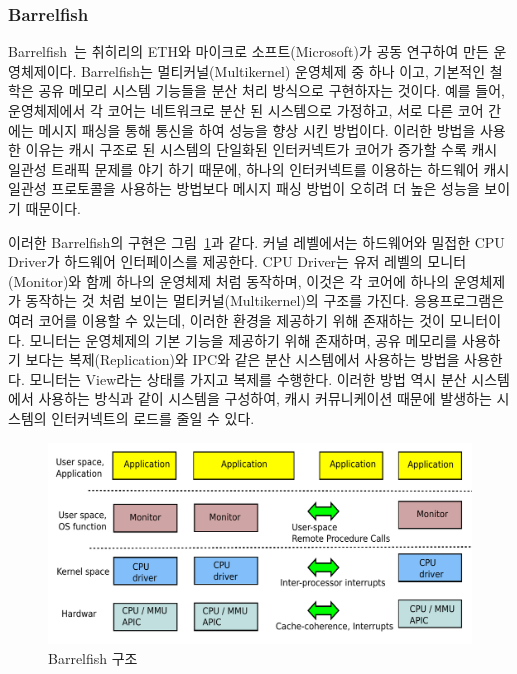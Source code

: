 \subsubsection{Barrelfish}

Barrelfish~\cite{Baumann2009Barrelfish}는 취히리의 ETH와 마이크로 소프트(Microsoft)가
공동 연구하여 만든 운영체제이다.
Barrelfish는 멀티커널(Multikernel) 운영체제 중 하나 이고, 기본적인 철학은 공유 메모리 시스템 
기능들을 분산 처리 방식으로 구현하자는 것이다.
예를 들어, 운영체제에서 각 코어는 네트워크로 분산 된 시스템으로 가정하고, 서로 다른 코어 간에는 메시지 
패싱을 통해 통신을 하여 성능을 향상 시킨 방법이다. 
이러한 방법을 사용한 이유는 캐시 구조로 된 시스템의 단일화된 인터커넥트가 코어가 증가할 수록 캐시 
일관성 트래픽 문제를 야기 하기 때문에, 하나의 인터커넥트를 이용하는 하드웨어 캐시 일관성 
프로토콜을 사용하는 방법보다 메시지 패싱 방법이 오히려 더 높은 성능을 보이기 때문이다. 

이러한 Barrelfish의 구현은 그림~\ref{fig:Barrelfish}과 같다.
커널 레벨에서는 하드웨어와 밀접한 CPU Driver가 하드웨어 인터페이스를 제공한다.
CPU Driver는 유저 레벨의 모니터(Monitor)와 함께 하나의 운영체제 처럼 동작하며, 
이것은 각 코어에 하나의 운영체제가 동작하는 것 처럼 보이는 멀티커널(Multikernel)의 구조를 가진다. 
응용프로그램은 여러 코어를 이용할 수 있는데, 이러한 환경을 제공하기 위해 존재하는 것이 모니터이다. 
모니터는 운영체제의 기본 기능을 제공하기 위해 존재하며, 공유 메모리를 사용하기 
보다는 복제(Replication)와 IPC와 같은 분산 시스템에서 사용하는 방법을 사용한다. 
모니터는 View라는 상태를 가지고 복제를 수행한다. 
이러한 방법 역시 분산 시스템에서 사용하는 방식과 같이 시스템을 구성하여, 캐시 커뮤니케이션 때문에 발생하는 
시스템의 인터커넥트의 로드를 줄일 수 있다.

\begin{figure}[h!]
    \centering
    \includegraphics[width=1\textwidth]{fig/multikernel/multikernel}
    \caption{Barrelfish 구조}
  \label{fig:Barrelfish}
\end{figure}

